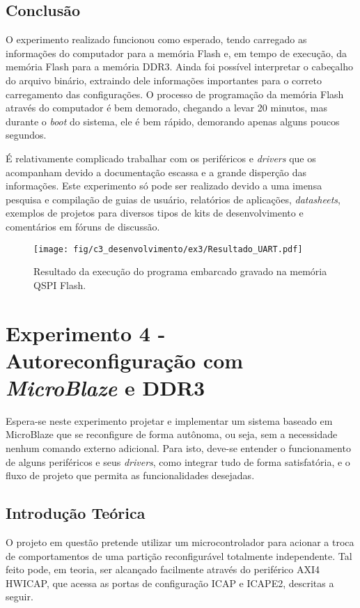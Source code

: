 \documentclass[11pt,a4paper,oneside]{book}
\begin{document}
\section{Conclusão}
O experimento realizado funcionou como esperado, tendo carregado as informações do computador para a memória Flash e, em tempo de execução, da memória Flash para a memória DDR3.
Ainda foi possível interpretar o cabeçalho do arquivo binário, extraindo dele informações importantes para o correto carregamento das configurações.
O processo de programação da memória Flash através do computador é bem demorado, chegando a levar 20 minutos, mas durante o \textit{boot} do sistema, ele é bem rápido, demorando apenas alguns poucos segundos.

É relativamente complicado trabalhar com os periféricos e \textit{drivers} que os acompanham devido a documentação escassa e a grande disperção das informações.
Este experimento só pode ser realizado devido a uma imensa pesquisa e compilação de guias de usuário, relatórios de aplicações, \textit{datasheets}, exemplos de projetos para diversos tipos de kits de desenvolvimento e comentários em fóruns de discussão.

\begin{figure}[htp]
\centering
\texttt{[image: fig/c3\_desenvolvimento/ex3/Resultado\_UART.pdf]}
\caption{Resultado da execução do programa embarcado gravado na memória QSPI Flash.}
\label{fig:ex3:resultado}
\end{figure}


\chapter{Experimento 4 - Autoreconfiguração com \textit{MicroBlaze} e DDR3}
Espera-se neste experimento projetar e implementar um sistema baseado em MicroBlaze que se reconfigure de forma autônoma, ou seja, sem a necessidade nenhum comando externo adicional.
Para isto, deve-se entender o funcionamento de alguns periféricos e seus \textit{drivers}, como integrar tudo de forma satisfatória, e o fluxo de projeto que permita as funcionalidades desejadas.

\section{Introdução Teórica}
O projeto em questão pretende utilizar um microcontrolador para acionar a troca de comportamentos de uma partição reconfigurável totalmente independente.
Tal feito pode, em teoria, ser alcançado facilmente através do periférico AXI4 HWICAP, que acessa as portas de configuração ICAP e ICAPE2, descritas a seguir.
\end{document}
